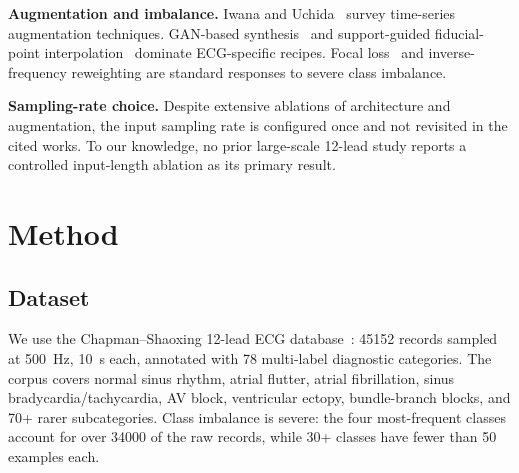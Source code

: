 \documentclass[conference]{IEEEtran}
\begin{document}
\textbf{Augmentation and imbalance.}
Iwana and Uchida~\cite{iwana2021} survey time-series augmentation
techniques. GAN-based synthesis~\cite{wang2020} and support-guided
fiducial-point interpolation~\cite{chen2021,xu2022} dominate ECG-specific
recipes. Focal loss~\cite{lin2017} and inverse-frequency reweighting are
standard responses to severe class imbalance.

\textbf{Sampling-rate choice.}
Despite extensive ablations of architecture and augmentation, the input
sampling rate is configured once and not revisited in the cited works.
To our knowledge, no prior large-scale 12-lead study reports a controlled
input-length ablation as its primary result.

\section{Method}
\subsection{Dataset}
We use the Chapman--Shaoxing 12-lead ECG database~\cite{zheng2020}:
\num{45152} records sampled at \SI{500}{\hertz}, \SI{10}{\second} each,
annotated with \num{78} multi-label diagnostic categories. The corpus
covers normal sinus rhythm, atrial flutter, atrial fibrillation, sinus
bradycardia/tachycardia, AV block, ventricular ectopy, bundle-branch
blocks, and \num{70}+ rarer subcategories. Class imbalance is severe:
the four most-frequent classes account for over \num{34000} of the raw
records, while \num{30}+ classes have fewer than \num{50} examples each.
\end{document}
